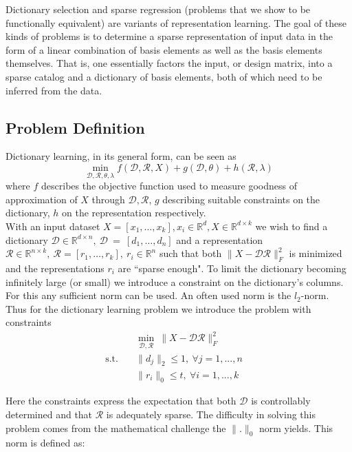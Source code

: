 \documentclass{article}
\newcommand{\R}{\mathbb{R}}
\newcommand{\Rr}{\mathcal{R}}
\newcommand{\D}{\mathcal{D}}
\begin{document}
Dictionary selection and sparse regression (problems that we show to be functionally equivalent) are variants of representation learning. The goal of these kinds of problems is to determine a sparse representation of input data in the form of a linear combination of basis elements as well as the basis elements themselves. That is, one essentially factors the input, or design matrix, into a sparse catalog and a dictionary of basis elements, both of which need to be inferred from the data.\\

\subsection{Problem Definition}\label{sec:problem}
\noindent Dictionary learning, in its general form, can be seen as
\[
\min_{\D, \Rr, \theta, \lambda} f(\D, \Rr, X) + g(\D, \theta) + h(\Rr, \lambda)
\]
where $f$ describes the objective function used to measure goodness of approximation of $X$ through $\D, \Rr$, $g$ describing suitable constraints on the dictionary, $h$ on the representation respectively.\\

\noindent With an input dataset $X=[x_1, \dots, x_k],  x_i \in \R^d,  X \in \R^{d\times k}$ we wish to find a dictionary $\D \in \R^{d\times n}, \   \D~=~[d_1, \dots, d_n]$ and a representation $\Rr \in\R^{n\times k}, \ \Rr = [r_1,\dots,r_k], \ r_i\in\R^n $  such that both $\|X-\D\Rr\|_F^2$ is minimized and the representations $r_i$ are ``sparse enough". To limit the dictionary becoming infinitely large (or small) we introduce a constraint on the dictionary's columns. For this any sufficient norm can be used. An often used norm is the $l_2$-norm. 
Thus for the dictionary learning problem we introduce the problem with constraints
\begin{align*}
         &\min_{\D, \Rr} \ \|X  -\D \Rr\|_F^2   \quad   \\
         \text{s.t.}  \quad  &\|d_j\|_2 \leq 1, \ \forall j=1, ...,n  \quad \\
          \quad  &\|r_i\|_0 \leq t,  \ \forall i=1, ...,k  \quad 
\end{align*}

\noindent Here the constraints express the expectation that both $\D$ is controllably determined and that $\Rr$ is adequately sparse. The difficulty in solving this problem comes from the mathematical challenge the $\| . \|_0$ norm yields. This norm is defined as:\\ 
\end{document}
